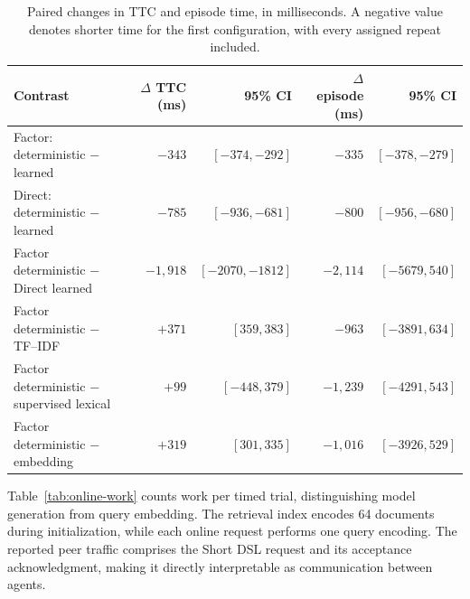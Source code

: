 \documentclass[sigconf,nonacm,balance=false]{aamas}
\newcommand{\tabstyle}{\small\setlength{\tabcolsep}{3pt}\renewcommand{\arraystretch}{1.10}}
\begin{document}
\begin{table}[!htbp]
\centering\tabstyle
\caption{Paired changes in TTC and episode time, in milliseconds. A negative value denotes shorter time for the first configuration, with every assigned repeat included.}
\label{tab:online-timing-effects}
\begin{tabular}{@{}lrrrr@{}}
\toprule
Contrast & $\Delta$ TTC (ms) & 95\% CI & $\Delta$ episode (ms) & 95\% CI\\\midrule
Factor: deterministic $-$ learned & $-343$ & $[-374,-292]$ & $-335$ & $[-378,-279]$\\
Direct: deterministic $-$ learned & $-785$ & $[-936,-681]$ & $-800$ & $[-956,-680]$\\
Factor deterministic $-$ Direct learned & $-1,918$ & $[-2070,-1812]$ & $-2,114$ & $[-5679,540]$\\
Factor deterministic $-$ TF--IDF & $+371$ & $[359,383]$ & $-963$ & $[-3891,634]$\\
Factor deterministic $-$ supervised lexical & $+99$ & $[-448,379]$ & $-1,239$ & $[-4291,543]$\\
Factor deterministic $-$ embedding & $+319$ & $[301,335]$ & $-1,016$ & $[-3926,529]$\\
\bottomrule\end{tabular}\end{table}

Table~\ref{tab:online-work} counts work per timed trial, distinguishing model generation from query embedding. The retrieval index encodes 64 documents during initialization, while each online request performs one query encoding. The reported peer traffic comprises the Short DSL request and its acceptance acknowledgment, making it directly interpretable as communication between agents.
\end{document}

